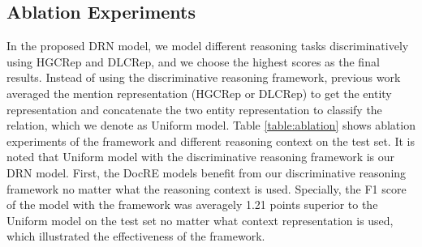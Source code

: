 \documentclass[11pt,a4paper]{article}
\begin{document}
\subsection{Ablation Experiments}
In the proposed DRN model, we model different reasoning tasks discriminatively using HGCRep and DLCRep, and we choose the highest scores as the final results.
Instead of using the discriminative reasoning framework, previous work averaged the mention representation (HGCRep or DLCRep) to get the entity representation and concatenate the two entity representation to classify the relation, which we denote as Uniform model.
Table \ref{table:ablation} shows ablation experiments of the framework and different reasoning context on the test set. 
It is noted that Uniform model with the discriminative reasoning framework is our DRN model.
First, the DocRE models benefit from our discriminative reasoning framework no matter what the reasoning context is used.
Specially, the F1 score of the model with the framework was averagely 1.21 points superior to the Uniform model on the test set no matter what context representation is used, which illustrated the effectiveness of the framework.
\end{document}
